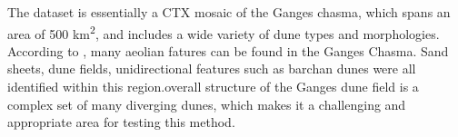 The dataset is essentially a CTX mosaic of the Ganges chasma, which spans an area of 500 km\textsuperscript{2}, and includes a wide variety of dune types and morphologies. According to \cite{fenton_aeolian_sediment_ganges_chasma_mars}, many aeolian fatures can be found in the Ganges Chasma. Sand sheets, dune fields, unidirectional features such as barchan dunes were all identified within this region.overall structure of the Ganges dune field is a complex set of many diverging dunes, which makes it a challenging and appropriate area for testing this method. 